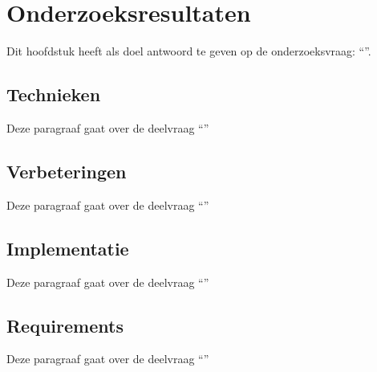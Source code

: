\chapter{Onderzoeksresultaten}

\label{Onderzoeksresultaten}

Dit hoofdstuk heeft als doel antwoord te geven op de onderzoeksvraag: \enquote{\hoofdvraagname}.

\section{Technieken}
Deze paragraaf gaat over de deelvraag \enquote{\deeltechnieken}


\section{Verbeteringen}
Deze paragraaf gaat over de deelvraag \enquote{\deelverbetering}


\section{Implementatie}
Deze paragraaf gaat over de deelvraag \enquote{\deelimplementatie}


\section{Requirements}
Deze paragraaf gaat over de deelvraag \enquote{\deelrequirements}

